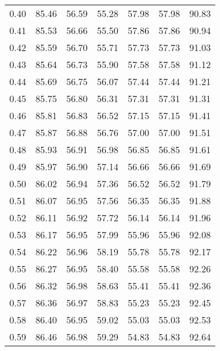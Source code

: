 \begin{tabular}{|c|c|c|c|c|c|c|}
      0.40 &     85.46 &     56.59 &      55.28 &   57.98 &      57.98 &         90.83 \\
      0.41 &     85.53 &     56.66 &      55.50 &   57.86 &      57.86 &         90.94 \\
      0.42 &     85.59 &     56.70 &      55.71 &   57.73 &      57.73 &         91.03 \\
      0.43 &     85.64 &     56.73 &      55.90 &   57.58 &      57.58 &         91.12 \\
      0.44 &     85.69 &     56.75 &      56.07 &   57.44 &      57.44 &         91.21 \\
      0.45 &     85.75 &     56.80 &      56.31 &   57.31 &      57.31 &         91.31 \\
      0.46 &     85.81 &     56.83 &      56.52 &   57.15 &      57.15 &         91.41 \\
      0.47 &     85.87 &     56.88 &      56.76 &   57.00 &      57.00 &         91.51 \\
      0.48 &     85.93 &     56.91 &      56.98 &   56.85 &      56.85 &         91.61 \\
      0.49 &     85.97 &     56.90 &      57.14 &   56.66 &      56.66 &         91.69 \\
      0.50 &     86.02 &     56.94 &      57.36 &   56.52 &      56.52 &         91.79 \\
      0.51 &     86.07 &     56.95 &      57.56 &   56.35 &      56.35 &         91.88 \\
      0.52 &     86.11 &     56.92 &      57.72 &   56.14 &      56.14 &         91.96 \\
      0.53 &     86.17 &     56.95 &      57.99 &   55.96 &      55.96 &         92.08 \\
      0.54 &     86.22 &     56.96 &      58.19 &   55.78 &      55.78 &         92.17 \\
      0.55 &     86.27 &     56.95 &      58.40 &   55.58 &      55.58 &         92.26 \\
      0.56 &     86.32 &     56.98 &      58.63 &   55.41 &      55.41 &         92.36 \\
      0.57 &     86.36 &     56.97 &      58.83 &   55.23 &      55.23 &         92.45 \\
      0.58 &     86.40 &     56.95 &      59.02 &   55.03 &      55.03 &         92.53 \\
      0.59 &     86.46 &     56.98 &      59.29 &   54.83 &      54.83 &         92.64 \\

\end{tabular}

